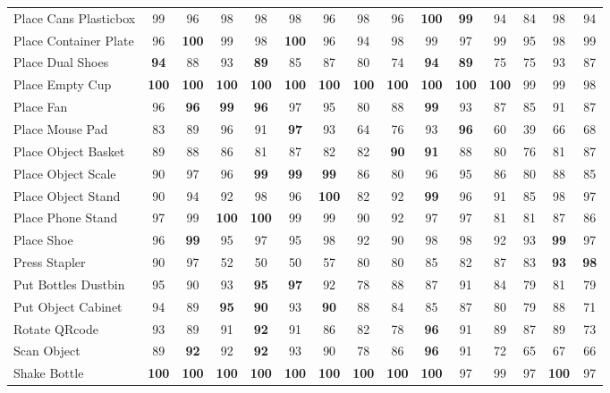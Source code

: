 \documentclass{article}
\begin{document}
\begin{table}[t]
{\begin{tabular}{lcc|cc|cc|cc|cc|cc|cc}
Place Cans Plasticbox & 99 & 96 & 98 & 98 & 98 & 96 & 98 & 96 & \textbf{100} & \textbf{99} & 94 & 84 & 98 & 94 \\
Place Container Plate & 96 & \textbf{100} & 99 & 98 & \textbf{100} & 96 & 94 & 98 & 99 & 97 & 99 & 95 & 98 & 99 \\
Place Dual Shoes & \textbf{94} & 88 & 93 & \textbf{89} & 85 & 87 & 80 & 74 & \textbf{94} & \textbf{89} & 75 & 75 & 93 & 87 \\
Place Empty Cup & \textbf{100} & \textbf{100} & \textbf{100} & \textbf{100} & \textbf{100} & \textbf{100} & \textbf{100} & \textbf{100} & \textbf{100} & \textbf{100} & \textbf{100} & 99 & 99 & 98 \\
Place Fan & 96 & \textbf{96} & \textbf{99} & \textbf{96} & 97 & 95 & 80 & 88 & \textbf{99} & 93 & 87 & 85 & 91 & 87 \\
Place Mouse Pad & 83 & 89 & 96 & 91 & \textbf{97} & 93 & 64 & 76 & 93 & \textbf{96} & 60 & 39 & 66 & 68 \\
Place Object Basket & 89 & 88 & 86 & 81 & 87 & 82 & 82 & \textbf{90} & \textbf{91} & 88 & 80 & 76 & 81 & 87 \\
Place Object Scale & 90 & 97 & 96 & \textbf{99} & \textbf{99} & \textbf{99} & 86 & 80 & 96 & 95 & 86 & 80 & 88 & 85 \\
Place Object Stand & 90 & 94 & 92 & 98 & 96 & \textbf{100} & 82 & 92 & \textbf{99} & 96 & 91 & 85 & 98 & 97 \\
Place Phone Stand & 97 & 99 & \textbf{100} & \textbf{100} & 99 & 99 & 90 & 92 & 97 & 97 & 81 & 81 & 87 & 86 \\
Place Shoe & 96 & \textbf{99} & 95 & 97 & 95 & 98 & 92 & 90 & 98 & 98 & 92 & 93 & \textbf{99} & 97 \\
Press Stapler & 90 & 97 & 52 & 50 & 50 & 57 & 80 & 80 & 85 & 82 & 87 & 83 & \textbf{93} & \textbf{98} \\
Put Bottles Dustbin & 95 & 90 & 93 & \textbf{95} & \textbf{97} & 92 & 78 & 88 & 87 & 91 & 84 & 79 & 81 & 79 \\
Put Object Cabinet & 94 & 89 & \textbf{95} & \textbf{90} & 93 & \textbf{90} & 88 & 84 & 85 & 87 & 80 & 79 & 88 & 71 \\
Rotate QRcode & 93 & 89 & 91 & \textbf{92} & 91 & 86 & 82 & 78 & \textbf{96} & 91 & 89 & 87 & 89 & 73 \\
Scan Object & 89 & \textbf{92} & 92 & \textbf{92} & 93 & 90 & 78 & 86 & \textbf{96} & 91 & 72 & 65 & 67 & 66 \\
Shake Bottle & \textbf{100} & \textbf{100} & \textbf{100} & \textbf{100} & \textbf{100} & \textbf{100} & \textbf{100} & \textbf{100} & \textbf{100} & 97 & 99 & 97 & \textbf{100} & 97 \\

\end{tabular}}
\end{table}
\end{document}
